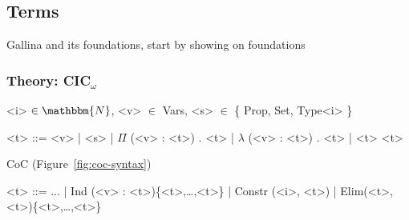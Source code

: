 \subsection{Terms}
\label{sec:mot-coq}

Gallina and its foundations, start by showing on foundations


\subsubsection{Theory: CIC$_{\omega}$}

\begin{figure*}
\small
\begin{grammar}
<i> $\in \mathbbm{N}$, <v> $\in$ Vars, <s> $\in$ \{ Prop, Set, Type<i> \}

<t> ::= <v> \hspace{0.06cm} | \hspace{0.06cm} <s> \hspace{0.06cm} | \hspace{0.06cm} $\Pi$ (<v> : <t>) . <t> \hspace{0.06cm} | \hspace{0.06cm} $\lambda$ (<v> : <t>) . <t> \hspace{0.06cm} | \hspace{0.06cm} <t> <t>
\end{grammar}
\vspace{-0.3cm}
\caption{Syntax for CoC$_\omega$ with (from left to right) variables, sorts, dependent types, functions, and application.}
\label{fig:coc-syntax}
\end{figure*}

CoC (Figure~\ref{fig:coc-syntax})

\begin{figure*}
\small
\begin{grammar}
<t> ::= ... | \hspace{0.06cm} Ind (<v> : <t>)\{<t>,\ldots,<t>\} \hspace{0.06cm} | \hspace{0.06cm} Constr (<i>, <t>) \hspace{0.06cm} | \hspace{0.06cm} Elim(<t>, <t>)\{<t>,\ldots,<t>\}
\end{grammar}
\vspace{-0.3cm}
\caption{CIC$_\omega$ is CoC$_\omega$ with inductive types, inductive constructors, and primitive eliminators.}
\label{fig:syntax}
\end{figure*}

